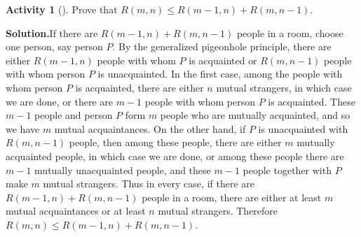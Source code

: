 \documentclass[10pt,]{book}
\theoremstyle{plain}
\theoremstyle{definition}
\newtheorem{activity}[project]{Activity}
\numberwithin{equation}{chapter}
\begin{document}
\begin{activity}[]\label{Ramseyrecurrence}
Prove that \(R(m,n)\le R(m-1,n) + R(m,n-1)\).%
\par\medskip\noindent%
\textbf{Solution.}\quad If there are \(R(m-1,n) +R(m,n-1)\) people in a room, choose one person, say person \(P\). By the generalized pigeonhole principle, there are either \(R(m-1,n)\) people with whom \(P\) is acquainted or \(R(m,n-1)\) people with whom person \(P\) is unacquainted. In the first case, among the people with whom person \(P\) is acquainted, there are either \(n\) mutual strangers, in which case we are done, or there are \(m-1\) people with whom person \(P\) is acquainted. These \(m-1\) people and person \(P\) form \(m\) people who are mutually acquainted, and so we have \(m\) mutual acquaintances. On the other hand, if \(P\) is unacquainted with \(R(m,n-1)\) people, then among these people, there are either \(m\) mutually acquainted people, in which case we are done, or among these people there are \(m-1\) mutually unacquainted people, and these \(m-1\) people together with \(P\) make \(m\) mutual strangers. Thus in every case, if there are \(R(m-1,n)+R(m,n-1)\) people in a room, there are either at least \(m\) mutual acquaintances or at least \(n\) mutual strangers. Therefore \(R(m,n)\le
R(m-1,n)+R(m,n-1)\).%
\end{activity}
\end{document}
